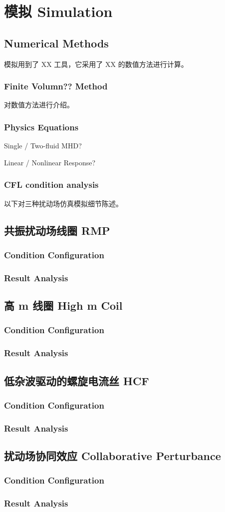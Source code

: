 \chapter{模拟 Simulation}

\section{Numerical Methods}
模拟用到了 XX 工具，它采用了 XX 的数值方法进行计算。

\subsection{Finite Volumn?? Method}
对数值方法进行介绍。

\subsection{Physics Equations}
Single / Two-fluid MHD?

Linear / Nonlinear Response?

\subsection{CFL condition analysis}


以下对三种扰动场仿真模拟细节陈述。
\section{共振扰动场线圈 RMP}
\subsection{Condition Configuration}
\subsection{Result Analysis}
\section{高 m 线圈 High m Coil}
\subsection{Condition Configuration}
\subsection{Result Analysis}
\section{低杂波驱动的螺旋电流丝 HCF}
\subsection{Condition Configuration}
\subsection{Result Analysis}
\section{扰动场协同效应 Collaborative Perturbance}
\subsection{Condition Configuration}
\subsection{Result Analysis}